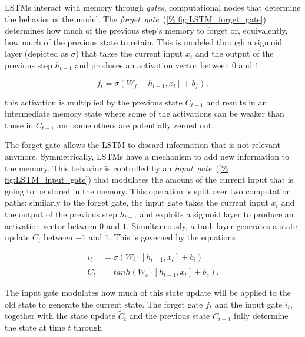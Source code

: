 LSTMs interact with memory through \emph{gates}, computational nodes that
determine the behavior of the model. The \emph{forget~gate}~(\autoref{%
fig:LSTM_forget_gate}) determines how much of the previous step's memory to
forget or, equivalently, how much of the previous state to retain.  This is
modeled through a sigmoid layer (depicted as $\sigma$) that takes the current
input $x_t$ and the output of the previous step $h_{t-1}$ and produces an
activation vector between $0$ and $1$

\begin{equation}\label{eq:LSTM_forget_gate}
    f_t = \sigma\left(W_f \cdot \left[h_{t-1}, x_t\right] + b_f \right),
\end{equation}

\noindent this activation is multiplied by the previous state $C_{t-1}$ and
results in an intermediate memory state where some of the activations can be
weaker than those in $C_{t-1}$ and some others are potentially zeroed out.

The forget gate allows the LSTM to discard information that is not relevant
anymore. Symmetrically, LSTMs have a mechanism to add new information to the
memory. This behavior is controlled by an \emph{input~gate}~(\autoref{%
fig:LSTM_input_gate}) that modulates the amount of the current input that is
going to be stored in the memory. This operation is split over two computation
paths: similarly to the forget gate, the input gate takes the current input
$x_t$ and the output of the previous step $h_{t-1}$ and exploits a sigmoid
layer to produce an activation vector between $0$ and $1$. Simultaneously, a
tanh layer generates a state update $\tilde C_t$ between $-1$ and $1$. This is
governed by the equations

\begin{equation}\label{eq:LSTM_input_gate}
\begin{split}
    i_t &= \sigma\left(W_i \cdot \left[h_{t-1}, x_t\right] + b_i \right)\\
    \tilde C_t &= tanh \left(W_c \cdot \left[h_{t-1}, x_t\right] + b_c \right).
\end{split}
\end{equation}

The input gate modulates how much of this state update will be applied to the
old state to generate the current state. The forget gate $f_t$ and the input
gate $i_t$, together with the state update $\tilde C_t$ and the previous state
$C_{t-1}$ fully determine the state at time $t$ through

